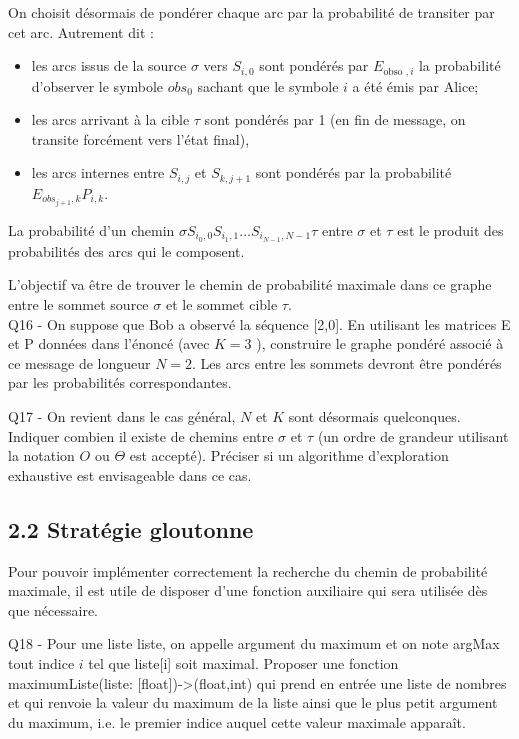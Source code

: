 \documentclass[10pt]{article}
\begin{document}
On choisit désormais de pondérer chaque arc par la probabilité de transiter par cet arc. Autrement dit :

\begin{itemize}
  \item les arcs issus de la source $\sigma$ vers $S_{i, 0}$ sont pondérés par $E_{\text {obso }, i}$ la probabilité d'observer le symbole $o b s_{0}$ sachant que le symbole $i$ a été émis par Alice;
  \item les arcs arrivant à la cible $\tau$ sont pondérés par 1 (en fin de message, on transite forcément vers l'état final),
  \item les arcs internes entre $S_{i, j}$ et $S_{k, j+1}$ sont pondérés par la probabilité $E_{o b s_{j+1}, k} P_{i, k}$.
\end{itemize}

La probabilité d'un chemin $\sigma S_{i_{0}, 0} S_{i_{1}, 1} \ldots S_{i_{N-1}, N-1} \tau$ entre $\sigma$ et $\tau$ est le produit des probabilités des arcs qui le composent.

L'objectif va être de trouver le chemin de probabilité maximale dans ce graphe entre le sommet source $\sigma$ et le sommet cible $\tau$.\\[0pt]
Q16 - On suppose que Bob a observé la séquence [2,0]. En utilisant les matrices E et P données dans l'énoncé (avec $K=3$ ), construire le graphe pondéré associé à ce message de longueur $N=2$. Les arcs entre les sommets devront être pondérés par les probabilités correspondantes.

Q17 - On revient dans le cas général, $N$ et $K$ sont désormais quelconques. Indiquer combien il existe de chemins entre $\sigma$ et $\tau$ (un ordre de grandeur utilisant la notation $O$ ou $\Theta$ est accepté). Préciser si un algorithme d'exploration exhaustive est envisageable dans ce cas.

\subsection*{2.2 Stratégie gloutonne}
Pour pouvoir implémenter correctement la recherche du chemin de probabilité maximale, il est utile de disposer d'une fonction auxiliaire qui sera utilisée dès que nécessaire.

Q18 - Pour une liste liste, on appelle argument du maximum et on note argMax tout indice $i$ tel que liste[i] soit maximal. Proposer une fonction maximumListe(liste: [float])->(float,int) qui prend en entrée une liste de nombres et qui renvoie la valeur du maximum de la liste ainsi que le plus petit argument du maximum, i.e. le premier indice auquel cette valeur maximale apparaît.
\end{document}
